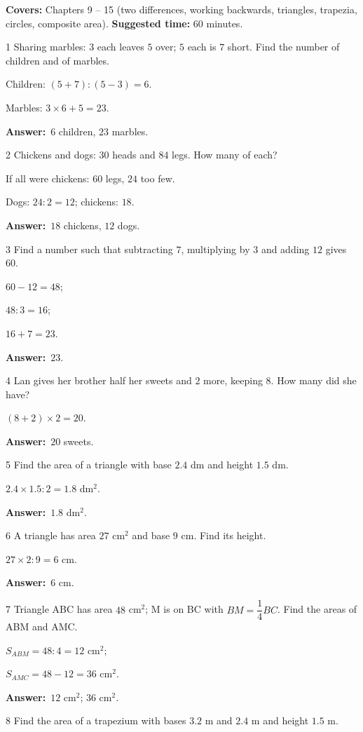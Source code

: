 \documentclass[11pt]{article}
\newif\ifsol \solfalse
\providecommand{\AnsWord}{Đáp số}
\newcommand{\dapso}[1]{\par\textbf{\AnsWord:}\ #1}
\newcommand{\probsol}[1]{%
  \begin{lrbox}{\solmeasure}\begin{minipage}{\dimexpr\linewidth-24pt\relax}#1\end{minipage}\end{lrbox}%
  \ifsol
    \begin{solbox}#1\end{solbox}%
  \else
    \setlength{\solht}{\dimexpr\ht\solmeasure+\dp\solmeasure+0.85cm\relax}%
    \ifdim\solht<1.35cm\setlength{\solht}{1.35cm}\fi
    \begin{tcolorbox}[colback=white,colframe=Line,boxrule=0.8pt,arc=5pt,
      left=8pt,right=8pt,top=4pt,bottom=4pt,height=\solht]{\footnotesize\color{Slate}\itshape\WorkWord}\end{tcolorbox}%
  \fi}
\newcommand{\gap}{\vspace{0.3cm}}
\def\WorkWord{Your work:}
\def\AnsWord{Answer}
\begin{document}
\begin{knowbox}
\textbf{Covers:} Chapters 9 -- 15 (two differences, working backwards, triangles, trapezia, circles, composite area). \quad \textbf{Suggested time:} $60$ minutes.
\end{knowbox}
\gap
\begin{probbox}{1}{\relax}
Sharing marbles: $3$ each leaves $5$ over; $5$ each is $7$ short. Find the number of children and of marbles.
\end{probbox}
\probsol{
Children: $(5+7):(5-3)=6$.\par Marbles: $3\times6+5=23$.
\dapso{$6$ children, $23$ marbles.}}
\gap
\begin{probbox}{2}{\relax}
Chickens and dogs: $30$ heads and $84$ legs. How many of each?
\end{probbox}
\probsol{
If all were chickens: $60$ legs, $24$ too few.\par Dogs: $24:2=12$; chickens: $18$.
\dapso{$18$ chickens, $12$ dogs.}}
\gap
\begin{probbox}{3}{\relax}
Find a number such that subtracting $7$, multiplying by $3$ and adding $12$ gives $60$.
\end{probbox}
\probsol{
$60-12=48$;\par $48:3=16$;\par $16+7=23$.
\dapso{$23$.}}
\gap
\begin{probbox}{4}{\relax}
Lan gives her brother half her sweets and $2$ more, keeping $8$. How many did she have?
\end{probbox}
\probsol{
$(8+2)\times2=20$.
\dapso{$20$ sweets.}}
\gap
\begin{probbox}{5}{\relax}
Find the area of a triangle with base $2.4$ dm and height $1.5$ dm.
\end{probbox}
\probsol{
$2.4\times1.5:2=1.8$ dm$^2$.
\dapso{$1.8$ dm$^2$.}}
\gap
\begin{probbox}{6}{\relax}
A triangle has area $27$ cm$^2$ and base $9$ cm. Find its height.
\end{probbox}
\probsol{
$27\times2:9=6$ cm.
\dapso{$6$ cm.}}
\gap
\begin{probbox}{7}{\relax}
Triangle ABC has area $48$ cm$^2$; M is on BC with $BM=\dfrac14BC$. Find the areas of ABM and AMC.
\end{probbox}
\probsol{
$S_{ABM}=48:4=12$ cm$^2$;\par $S_{AMC}=48-12=36$ cm$^2$.
\dapso{$12$ cm$^2$; $36$ cm$^2$.}}
\gap
\begin{probbox}{8}{\relax}
Find the area of a trapezium with bases $3.2$ m and $2.4$ m and height $1.5$ m.
\end{probbox}
\end{document}
